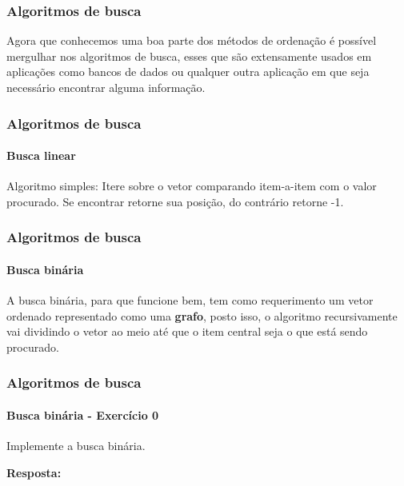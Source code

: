 \begin{frame}
	\frametitle{Algoritmos de busca}
	\par Agora que conhecemos uma boa parte dos métodos de ordenação é possível mergulhar nos algoritmos de busca, esses que são extensamente usados em aplicações como bancos de dados ou qualquer outra aplicação em que seja necessário encontrar alguma informação.
\end{frame}

\begin{frame}
	\frametitle{Algoritmos de busca}
	\framesubtitle{Busca linear}
	\par Algoritmo simples: Itere sobre o vetor comparando item-a-item com o valor procurado. Se encontrar retorne sua posição, do contrário retorne -1.
\end{frame}

\begin{frame}
	\frametitle{Algoritmos de busca}
	\framesubtitle{Busca binária}
	\par A busca binária, para que funcione bem, tem como requerimento um vetor ordenado representado como uma \textbf{grafo}, posto isso, o algoritmo recursivamente vai dividindo o vetor ao meio até que o item central seja o que está sendo procurado.
\end{frame}

\begin{frame}
	\frametitle{Algoritmos de busca}
	\framesubtitle{Busca binária - Exercício 0}
	\par Implemente a busca binária.
	\pause
	\par \textbf{Resposta:}
	
\end{frame}

